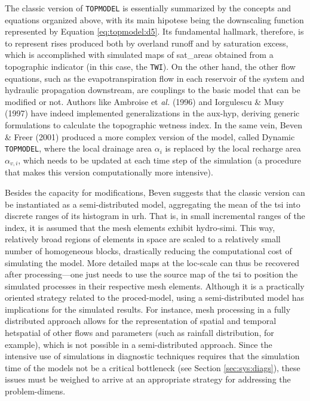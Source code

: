 \documentclass[./main_en.tex]{subfiles}
\begin{document}
\par The classic version of \texttt{TOPMODEL} is essentially summarized by the concepts and equations organized above, with its main \gls{hipotese} being the \gls{downscaling} function represented by Equation \eqref{eq:topmodel:d5}. Its fundamental hallmark, therefore, is to represent rises produced both by overland runoff and by saturation excess, which is accomplished with simulated maps of \gls{sat_areas} obtained from a topographic indicator (in this case, the \texttt{TWI}). On the other hand, the other flow equations, such as the evapotranspiration flow in each reservoir of the \gls{system} and hydraulic propagation downstream, are couplings to the basic \gls{model} that can be modified or not. Authors like Ambroise et \textit{al.} (1996) \cite{Ambroise1996a} and Iorgulescu \& Musy (1997) \cite{Iorgulescu1997a} have indeed implemented generalizations in the \gls{aux-hyp}, deriving generic formulations to calculate the topographic wetness index. In the same vein, Beven \& Freer (2001) \cite{Beven2001b} produced a more complex version of the \gls{model}, called Dynamic \texttt{TOPMODEL}, where the local drainage area $\alpha_i$ is replaced by the local recharge area $\alpha_{v, i}$, which needs to be updated at each time step of the simulation (a procedure that makes this version computationally more intensive).

\par Besides the capacity for modifications, Beven \cite{Beven2012} suggests that the classic version can be instantiated as a semi-distributed \gls{model}, aggregating the mean of the \gls{tsi} into discrete ranges of its histogram in \gls{urh}. That is, in small incremental ranges of the index, it is assumed that the mesh elements exhibit \gls{hydro-simi}. This way, relatively broad regions of elements in space are scaled to a relatively small number of homogeneous blocks, drastically reducing the computational cost of simulating the \gls{model}. More detailed maps at the \gls{loc-scale} can thus be recovered after processing—one just needs to use the source map of the \gls{tsi} to position the simulated processes in their respective mesh elements. Although it is a practically oriented strategy related to the \gls{proced-model}, using a semi-distributed \gls{model} has implications for the simulated results. For instance, mesh processing in a fully distributed approach allows for the representation of spatial and temporal \gls{hetspatial} of other flows and \gls{parameters} (such as rainfall distribution, for example), which is not possible in a semi-distributed approach. Since the intensive use of simulations in diagnostic techniques requires that the simulation time of the models not be a critical bottleneck (see Section \ref{sec:sys:diags}), these issues must be weighed to arrive at an appropriate strategy for addressing the \gls{problem-dimens}.
\end{document}
